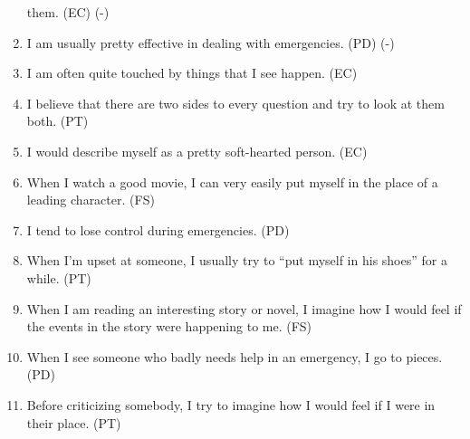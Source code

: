 \begin{enumerate}
them. (EC) (-)
\item I am usually pretty effective in dealing with emergencies. (PD) (-)
\item I am often quite touched by things that I see happen. (EC)
\item I believe that there are two sides to every question and try to look at them both. (PT)
\item I would describe myself as a pretty soft-hearted person. (EC)
\item When I watch a good movie, I can very easily put myself in the place of a leading
character. (FS)
\item I tend to lose control during emergencies. (PD)
\item When I'm upset at someone, I usually try to ``put myself in his shoes'' for a while. (PT)
\item When I am reading an interesting story or novel, I imagine how I would feel if the
events in the story were happening to me. (FS)
\item When I see someone who badly needs help in an emergency, I go to pieces. (PD)
\item Before criticizing somebody, I try to imagine how I would feel if I were in their place.
(PT) 
\end{enumerate}